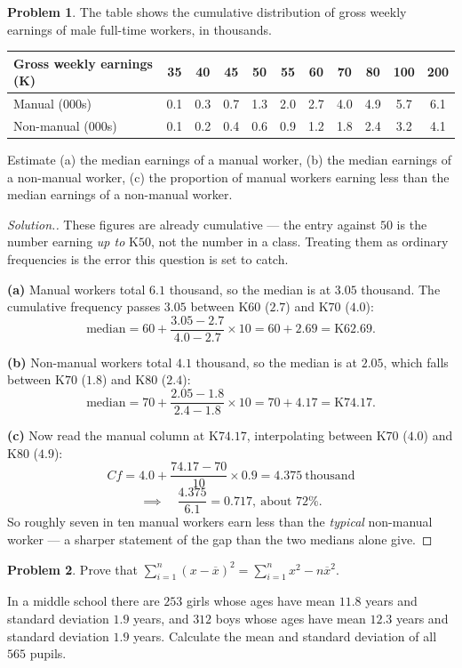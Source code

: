 \documentclass[11pt,a4paper]{article}
\theoremstyle{definition}
\newtheorem{problemx}{Problem}[section]
\newenvironment{problem}{\begin{problemx}}{\end{problemx}}
\newenvironment{solution}
  {\renewcommand{\qedsymbol}{}\begin{proof}[\textit{Solution}.]}
  {\end{proof}}
\begin{document}
\begin{problem}
The table shows the cumulative distribution of gross weekly earnings of male full-time
workers, in thousands.
\begin{table}[H]
\centering
\begin{tabular}{|l|c|c|c|c|c|c|c|c|c|c|}
\hline
Gross weekly earnings (K) & 35 & 40 & 45 & 50 & 55 & 60 & 70 & 80 & 100 & 200\\
\hline
Manual (000s) & 0.1 & 0.3 & 0.7 & 1.3 & 2.0 & 2.7 & 4.0 & 4.9 & 5.7 & 6.1\\
Non-manual (000s) & 0.1 & 0.2 & 0.4 & 0.6 & 0.9 & 1.2 & 1.8 & 2.4 & 3.2 & 4.1\\
\hline
\end{tabular}
\end{table}
Estimate (a) the median earnings of a manual worker, (b) the median earnings of a non-manual
worker, (c) the proportion of manual workers earning less than the median earnings of a
non-manual worker.
\end{problem}

\begin{solution}
These figures are already cumulative --- the entry against $50$ is the number earning
\emph{up to} K$50$, not the number in a class. Treating them as ordinary frequencies is the
error this question is set to catch.

\textbf{(a)} Manual workers total $6.1$ thousand, so the median is at $3.05$ thousand. The
cumulative frequency passes $3.05$ between K$60$ ($2.7$) and K$70$ ($4.0$):
\[\text{median}=60+\frac{3.05-2.7}{4.0-2.7}\times 10=60+2.69=\text{K}62.69.\]

\textbf{(b)} Non-manual workers total $4.1$ thousand, so the median is at $2.05$, which falls
between K$70$ ($1.8$) and K$80$ ($2.4$):
\[\text{median}=70+\frac{2.05-1.8}{2.4-1.8}\times 10=70+4.17=\text{K}74.17.\]

\textbf{(c)} Now read the manual column at K$74.17$, interpolating between K$70$ ($4.0$) and
K$80$ ($4.9$):
\[Cf=4.0+\frac{74.17-70}{10}\times 0.9=4.375\ \text{thousand}\]
\[\implies\quad \frac{4.375}{6.1}=0.717,\ \text{about }72\%.\]
So roughly seven in ten manual workers earn less than the \emph{typical} non-manual worker
--- a sharper statement of the gap than the two medians alone give.
\end{solution}

\begin{problem}
Prove that $\sum_{i=1}^{n}(x-\overline{x})^2=\sum_{i=1}^{n}x^2-n\overline{x}^2$.

In a middle school there are $253$ girls whose ages have mean $11.8$ years and standard
deviation $1.9$ years, and $312$ boys whose ages have mean $12.3$ years and standard
deviation $1.9$ years. Calculate the mean and standard deviation of all $565$ pupils.
\end{problem}
\end{document}
